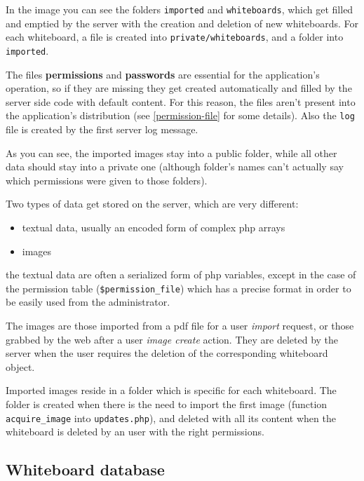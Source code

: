\documentclass[10pt,a4paper,english]{book}
\begin{document}
In the image you can see the folders \texttt{imported} and \texttt{whiteboards},
which get filled and emptied by the server with the creation and
deletion of new whiteboards. For each whiteboard, a file is created
into \texttt{private/whiteboards}, and a folder into \texttt{imported}.

The files \textbf{permissions} and \textbf{passwords} are essential for the
application's operation, so if they are missing they get created
automatically and filled by the server side code with default
content. For this reason, the files aren't present into the
application's distribution (see \href{\#permission-file}{\ref*{permission-file}} for some
details). Also the \texttt{log} file is created by the first server log
message.

As you can see, the imported images stay into a public folder, while
all other data should stay into a private one (although folder's names
can't actually say which permissions were given to those folders).

Two types of data get stored on the server, which are very different:
\begin{itemize}
\item {} 
textual data, usually an encoded form of complex php arrays

\item {} 
images

\end{itemize}

the textual data are often a serialized form of php variables, except
in the case of the permission table (\texttt{{\$}permission{\_}file}) which has a
precise format in order to be easily used from the administrator.

The images are those imported from a pdf file for a user \emph{import}
request, or those grabbed by the web after a user \emph{image create}
action. They are deleted by the server when the user requires the
deletion of the corresponding whiteboard object.

Imported images reside in a folder which is specific for each
whiteboard. The folder is created when there is the need to import the
first image (function \texttt{acquire{\_}image} into \texttt{updates.php}), and
deleted with all its content when the whiteboard is deleted by an user
with the right permissions.



\hypertarget{whiteboard-database}{}
\subsection{Whiteboard database}
\label{whiteboard-database}
\end{document}

